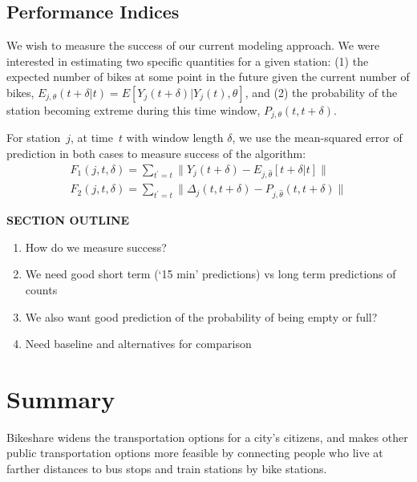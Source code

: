 \documentclass{acm_proc_article-sp}
\begin{document}
\vspace{0.5cm}

\subsection{Performance Indices}

We wish to measure the success of our current modeling approach.  We were interested in estimating two specific quantities for a given station: (1) the expected number of bikes at some point in the future given the current number of bikes, $E_{j, \theta} (t+\delta | t) = E[ Y_j(t+\delta) | Y_j(t), \theta]$, and (2) the probability of the station becoming extreme during this time window, $P_{j,\theta} (t, t+\delta)$.

For station~$j$, at time~$t$ with window length $\delta$, we use the mean-squared error of prediction in both cases to measure success of the algorithm:
\begin{align}
F_1(j, t, \delta) = \sum_{t^\prime = t} \| Y_j(t + \delta) - E_{j,\hat{\theta}} [ t+\delta | t] \| \\
F_2(j, t, \delta) = \sum_{t^\prime = t} \| \Delta_j(t,t + \delta) - P_{j,\hat{\theta}} ( t, t+\delta) \|
\end{align}

\cite{bowman:reasoning}

\vspace{0.25cm}
{\bf SECTION OUTLINE}
\begin{enumerate}
\item How do we measure success?
\item We need good short term (`15 min' predictions) vs long term predictions of counts
\item We also want good prediction of the probability of being empty or full?
\item Need baseline and alternatives for comparison
\end{enumerate}
\vspace{0.5cm}

\section{Summary}
Bikeshare widens the transportation options for a city's citizens, and makes other public transportation options more feasible by connecting people who live at farther distances to bus stops and train stations by bike stations. 



\end{document}

